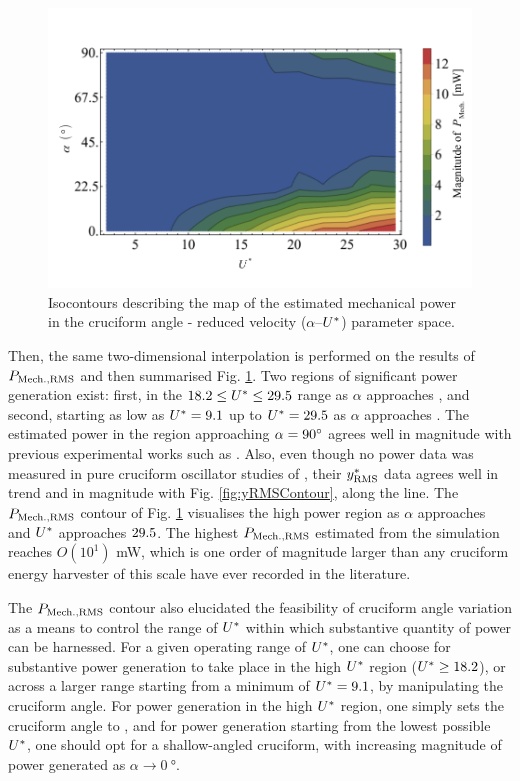 \documentclass[oneside]{utmthesis}
\begin{document}
\begin{figure}
  \centering
  \includegraphics[width=1\textwidth]{figs/mechanicalPowerContours}
  \caption{Isocontours describing the map of the estimated mechanical power in the cruciform angle - reduced velocity ($\alpha$--$U^{*}$) parameter space.}
  \label{fig:mechanicalPowerContour}
\end{figure}

Then, the same two-dimensional interpolation is performed on the results of $P_{\text{Mech.,RMS}}$ and then summarised Fig. \ref{fig:mechanicalPowerContour}. Two regions of significant power generation exist: first, in the $18.2 \leq U^{*} \leq 29.5$ range as $\alpha$ approaches \angfi{}, and second, starting as low as $U^{*} = 9.1$ up to $U^{*} = 29.5$ as $\alpha$ approaches \angon{}. The estimated power in the region approaching $\alpha = \angfi{}$ agrees well in magnitude with previous experimental works such as \citet{Koide2013}. Also, even though no power data was measured in pure cruciform oscillator studies of \citet{Koide2009,Nguyen2012}, their $y^{*}_{\text{RMS}}$ data agrees well in trend and in magnitude with Fig. \ref{fig:yRMSContour}, along the \angfi{} line. The $P_{\text{Mech.,RMS}}$ contour of Fig. \ref{fig:mechanicalPowerContour} visualises the high power region as $\alpha$ approaches \angon{} and $U^{*}$ approaches $29.5$. The highest $P_{\text{Mech.,RMS}}$ estimated from the simulation reaches $O(10^{1})$ \si{\milli\watt}, which is one order of magnitude larger than any cruciform energy harvester of this scale have ever recorded in the literature.

The $P_{\text{Mech.,RMS}}$ contour also elucidated the feasibility of cruciform angle variation as a means to control the range of $U^{*}$ within which substantive quantity of power can be harnessed. For a given operating range of $U^{*}$, one can choose for substantive power generation to take place in the high $U^{*}$ region ($U^{*} \geq 18.2$), or across a larger range starting from a minimum of $U^{*} = 9.1$, by manipulating the cruciform angle. For power generation in the high $U^{*}$ region, one simply sets the cruciform angle to \angfi{}, and for power generation starting from the lowest possible $U^{*}$, one should opt for a shallow-angled cruciform, with increasing magnitude of power generated as $\alpha \rightarrow \SI{0}{\degree}$.
\end{document}
